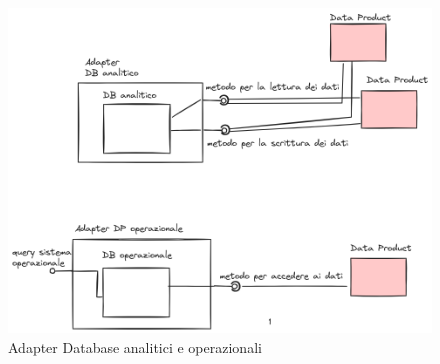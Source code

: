 \documentclass[12pt]{report}
\begin{document}
\begin{figure}
    \centering
    \includegraphics[width=\linewidth]{immagini/Data Mesh con DB Adapter 2024-03-06 17.45.31.excalidraw.png}
    \caption{Adapter Database analitici e operazionali}
    \label{fig:AdapterDB}
\end{figure}
\end{document}
